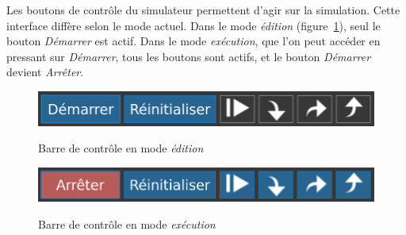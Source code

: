 \documentclass{tufte-handout}
\begin{document}
Les boutons de contrôle du simulateur permettent d'agir sur la simulation. 
Cette interface diffère selon le mode actuel. Dans le mode \emph{édition} (figure~\ref{f:controles1}), seul le bouton \textit{Démarrer} est actif. Dans le mode \emph{exécution}, que l'on peut accéder en pressant sur \textit{Démarrer}, tous les boutons sont actifs, et le bouton \textit{Démarrer} devient \textit{Arrêter}. 
\begin{figure}[h!]
\raggedleft
\includegraphics[width=0.8\linewidth]{pics/controles_1b.png}
\label{f:controles1}
\caption{Barre de contrôle en mode \emph{édition}}
\end{figure}
\begin{figure}[h!]
\raggedleft
\includegraphics[width=0.8\linewidth]{pics/controles_2b.png}
\label{f:controles2}
\caption{Barre de contrôle en mode \emph{exécution}}
\end{figure}
\end{document}
